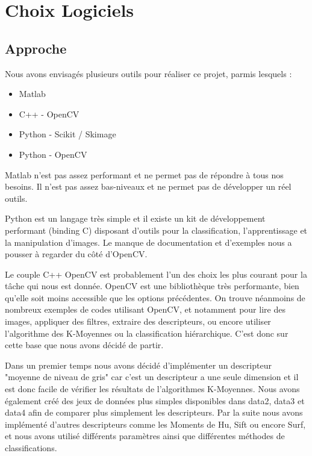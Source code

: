 \documentclass[12pt,a4paper,utf8x]{report}
\begin{document}
\chapter{Choix Logiciels}

\section{Approche}
    Nous avons envisagés plusieurs outils pour réaliser ce projet, parmis lesquels :

    \begin{itemize}
        \item Matlab
        \item C++ - OpenCV
        \item Python - Scikit / Skimage
        \item Python - OpenCV
    \end{itemize}

    Matlab n'est pas assez performant et ne permet pas de répondre à tous nos besoins. Il n'est pas assez bas-niveaux et ne permet pas de développer un réel outils.

    Python est un langage très simple et il existe un kit de développement performant (binding C) disposant d'outils pour la classification, l'apprentissage et la manipulation d'images. Le manque de documentation et d'exemples nous a pousser à regarder du côté d'OpenCV.

    Le couple C++ OpenCV est probablement l'un des choix les plus courant pour la tâche qui nous est donnée. OpenCV est une bibliothèque très performante, bien qu'elle soit moins accessible que les options précédentes. On trouve néanmoins de nombreux exemples de codes utilisant OpenCV, et notamment pour lire des images, appliquer des filtres, extraire des descripteurs, ou encore utiliser l'algorithme des K-Moyennes ou la classification hiérarchique. C'est donc sur cette base que nous avons décidé de partir.

    Dans un premier temps nous avons décidé d'implémenter un descripteur "moyenne de niveau de gris" car c'est un descripteur a une seule dimension et il est donc facile de vérifier les résultats de l'algorithmes K-Moyennes. Nous avons également créé des jeux de données plus simples disponibles dans data2, data3 et data4 afin de comparer plus simplement les descripteurs. Par la suite nous avons implémenté d'autres descripteurs comme les Moments de Hu, Sift ou encore Surf, et nous avons utilisé différents paramètres ainsi que différentes méthodes de classifications.
\end{document}
